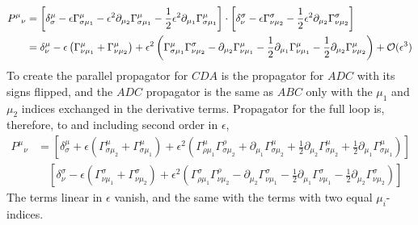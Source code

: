 \begin{align}
    P^\mu{}_{\nu}
    & = \left[ 
        \delta^\mu_\sigma 
        -\epsilon \Gamma^{\mu}_{\sigma \mu_1}
        - \epsilon^2 \partial_{\mu_2} \Gamma^{\mu}_{\sigma \mu_1}
        - \frac{1}{2} \epsilon^2 \partial_{\mu_1} \Gamma^{\mu}_{\sigma \mu_1}
    \right]
    \cdot 
    \left[
        \delta^\sigma_\nu
        - \epsilon\Gamma^{\sigma}_{\nu \mu_2}
        - \frac{1}{2} \epsilon^2 \partial_{\mu_2} \Gamma^{\sigma}_{\nu \mu_2}
    \right] \\
    &=
    \delta^\mu_\nu
    - \epsilon 
    \left(
        \Gamma^{\mu}_{\nu \mu_1}
        +
        \Gamma^{\mu}_{\nu \mu_2}
    \right)
    + \epsilon^2
    \left(  
        \Gamma^{\mu}_{\sigma \mu_1} \Gamma^{\sigma}_{\nu \mu_2}
        - \partial_{\mu_2} \Gamma^{\mu}_{\nu \mu_1}
        - \frac{1}{2} \partial_{\mu_1} \Gamma^{\mu}_{\nu \mu_1}
        - \frac{1}{2} \partial_{\mu_2} \Gamma^{\mu}_{\nu \mu_2}
    \right)
    + \mathcal O(\epsilon^3)
\end{align}
%
To create the parallel propagator for $CDA$ is the propagator for $ADC$ with its signs flipped, and the $ADC$ propagator is the same as $ABC$ only with the $\mu_1$ and $\mu_2$ indices exchanged in the derivative terms.
Propagator for the full loop is, therefore, to and including second order in $\epsilon$,
%
\begin{align}
    P^\mu{}_\nu
    & =
    \left[
        \delta^\mu_\sigma
        + \epsilon 
        \left(
            \Gamma^{\mu}_{\sigma \mu_2}
            +\Gamma^{\mu}_{\sigma \mu_1}
        \right)
        + \epsilon^2
        \left( 
            \Gamma^{\mu}_{\rho \mu_1} \Gamma^{\rho}_{\sigma \mu_2}
            + \partial_{\mu_1} \Gamma^{\mu}_{\sigma \mu_2}
            + \frac{1}{2} \partial_{\mu_2} \Gamma^{\mu}_{\sigma \mu_2}
            + \frac{1}{2} \partial_{\mu_1} \Gamma^{\mu}_{\sigma \mu_1}
        \right)
    \right] \\
    & \quad
    \left[
        \delta^\sigma_\nu
        - \epsilon 
        \left(
            \Gamma^{\sigma}_{\nu \mu_1}
            +\Gamma^{\sigma}_{\nu \mu_2}
        \right)
        + \epsilon^2
        \left(  
            \Gamma^{\sigma}_{\rho \mu_1} \Gamma^{\rho}_{\nu \mu_2}
            - \partial_{\mu_2} \Gamma^{\sigma}_{\nu \mu_1}
            - \frac{1}{2} \partial_{\mu_1} \Gamma^{\sigma}_{\nu \mu_1}
            - \frac{1}{2} \partial_{\mu_2} \Gamma^{\sigma}_{\nu \mu_2}
        \right)
    \right]
\end{align}
%
The terms linear in $\epsilon$ vanish, and the same with the terms with two equal $\mu_i$-indices.
